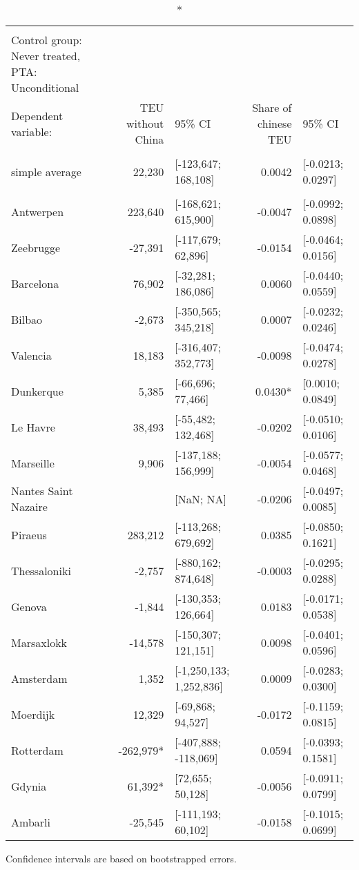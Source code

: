\setlength{\LTpost}{0mm}
\begin{longtable}{l|rlrl}
\caption*{
{\large Aggregated average treatment effects on container throughput from different origins} \\ 
{\small Control group: Never treated, PTA: Unconditional}
} \\ 
\toprule
\multicolumn{1}{l}{Dependent variable:} & TEU without China & 95\% CI & Share of chinese TEU & 95\% CI \\ 
\midrule\addlinespace[2.5pt]
\multicolumn{5}{l}{\vspace*{-5mm}} \\ 
\midrule\addlinespace[2.5pt]
simple average &   22,230 & [-123,647; 168,108] &  0.0042 & [-0.0213; 0.0297] \\ 
\midrule\addlinespace[2.5pt]
\multicolumn{5}{l}{by group:} \\ 
\midrule\addlinespace[2.5pt]
Antwerpen &  223,640 & [-168,621; 615,900] & -0.0047 & [-0.0992; 0.0898] \\ 
Zeebrugge &  -27,391 & [-117,679; 62,896] & -0.0154 & [-0.0464; 0.0156] \\ 
Barcelona &   76,902 & [-32,281; 186,086] &  0.0060 & [-0.0440; 0.0559] \\ 
Bilbao &   -2,673 & [-350,565; 345,218] &  0.0007 & [-0.0232; 0.0246] \\ 
Valencia &   18,183 & [-316,407; 352,773] & -0.0098 & [-0.0474; 0.0278] \\ 
Dunkerque &    5,385 & [-66,696; 77,466] &  0.0430* & [0.0010; 0.0849] \\ 
Le Havre &   38,493 & [-55,482; 132,468] & -0.0202 & [-0.0510; 0.0106] \\ 
Marseille &    9,906 & [-137,188; 156,999] & -0.0054 & [-0.0577; 0.0468] \\ 
Nantes Saint Nazaire &  & [NaN; NA] & -0.0206 & [-0.0497; 0.0085] \\ 
Piraeus &  283,212 & [-113,268; 679,692] &  0.0385 & [-0.0850; 0.1621] \\ 
Thessaloniki &   -2,757 & [-880,162; 874,648] & -0.0003 & [-0.0295; 0.0288] \\ 
Genova &   -1,844 & [-130,353; 126,664] &  0.0183 & [-0.0171; 0.0538] \\ 
Marsaxlokk &  -14,578 & [-150,307; 121,151] &  0.0098 & [-0.0401; 0.0596] \\ 
Amsterdam &    1,352 & [-1,250,133; 1,252,836] &  0.0009 & [-0.0283; 0.0300] \\ 
Moerdijk &   12,329 & [-69,868; 94,527] & -0.0172 & [-0.1159; 0.0815] \\ 
Rotterdam & -262,979* & [-407,888; -118,069] &  0.0594 & [-0.0393; 0.1581] \\ 
Gdynia &   61,392* & [72,655; 50,128] & -0.0056 & [-0.0911; 0.0799] \\ 
Ambarli &  -25,545 & [-111,193; 60,102] & -0.0158 & [-0.1015; 0.0699] \\ 
\bottomrule
\end{longtable}
\begin{minipage}{\linewidth}
Confidence intervals are based on bootstrapped errors.\\
\end{minipage}

